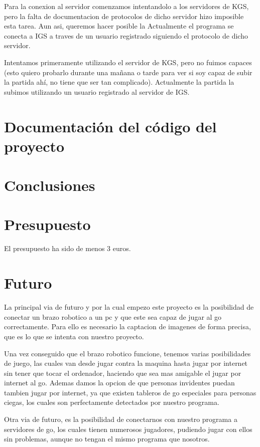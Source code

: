 \documentclass[12pt,a4paper]{report}
\begin{document}
Para la conexion al servidor comenzamos intentandolo a los servidores de KGS, pero la falta de documentacion de protocolos de dicho servidor hizo imposible esta tarea. Aun asi, queremos hacer posible la  Actualmente el programa se conecta a IGS a traves de un usuario registrado siguiendo el protocolo de dicho servidor. 


Intentamos primeramente utilizando el servidor de KGS, pero no fuimos capaces (esto quiero probarlo durante una mañana o tarde para ver si soy capaz de subir la partida ahí, no tiene que ser tan complicado).
Actualmente la partida la subimos utilizando un usuario registrado al servidor de IGS. 


\chapter{Documentación del código del proyecto}


\chapter{Conclusiones}


\chapter{Presupuesto}
El presupuesto ha sido de menos 3 euros.

\chapter{Futuro}


La principal via de futuro y por la cual empezo este proyecto es la posibilidad de conectar un brazo robotico a un pc y que este sea capaz de jugar al go correctamente. Para ello es necesario la captacion de imagenes de forma precisa, que es lo que se intenta con nuestro proyecto. 

Una vez conseguido que el brazo robotico funcione, tenemos varias posibilidades de juego, las cuales van desde jugar contra la maquina hasta jugar por internet sin tener que tocar el ordenador, haciendo que sea mas amigable el jugar por internet al go. Ademas damos la opcion de que personas invidentes puedan tambien jugar por internet, ya que existen tableros de go especiales para personas ciegas, los cuales son perfectamente detectados por nuestro programa.

Otra via de futuro, es la posibilidad de conectarnos con nuestro programa a servidores de go, los cuales tienen numerosos jugadores, pudiendo jugar con ellos sin problemas, aunque no tengan el mismo programa que nosotros.
\end{document}
